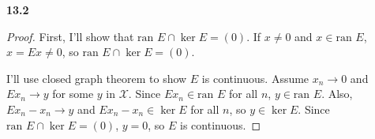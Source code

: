 \documentclass[a4paper, 12pt]{article}
\newcommand{\ran}{\textrm{ran }}
\theoremstyle{Mydefinition}
\theoremstyle{Mytheorem}
\begin{document}
\noindent \textbf{13.2}
\begin{proof}
First, I'll show that $\ran E\cap \ker E = (0)$. If $x\neq 0$ and $x\in \ran E$, $x = Ex\neq 0$, so $\ran E\cap \ker E = (0)$.

I'll use closed graph theorem to show $E$ is continuous. Assume $x_n\rightarrow 0$ and $Ex_n\rightarrow y$ for some $y$ in $\mathscr{X}$. Since $Ex_n\in \ran E$ for all $n$, $y\in \ran E$. Also, $Ex_n-x_n\rightarrow y$ and $Ex_n-x_n\in \ker E$ for all $n$, so $y\in \ker E$. Since $\ran E\cap \ker E = (0)$, $y = 0$, so $E$ is continuous.

\end{proof}
\end{document}
